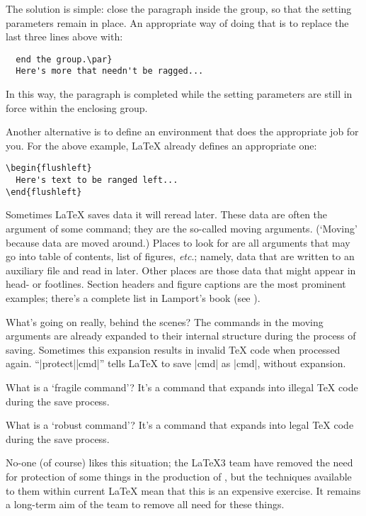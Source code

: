 \begin{changemargin}{-1cm}{-1cm}
The solution is simple: close the paragraph inside the group, so that
the setting parameters remain in place.  An appropriate way of doing
that is to replace the last three lines above with:
\begin{verbatim}
  end the group.\par}
  Here's more that needn't be ragged...
\end{verbatim}
In this way, the paragraph is completed while the setting parameters
are still in force within the enclosing group.

Another alternative is to define an environment that does the
appropriate job for you.  For the above example, \LaTeX{} already
defines an appropriate one:
\begin{verbatim}
\begin{flushleft}
  Here's text to be ranged left...
\end{flushleft}
\end{verbatim}


Sometimes \LaTeX{} saves data it will reread later. These data are
often the argument of some command; they are the so-called moving
arguments.  (`Moving' because data are moved around.)  Places to look for
are all arguments that may go into table of contents, list of figures,
\emph{etc}.; namely, data that are written to an auxiliary file and
read in later.  Other places are those data that might appear in head-
or footlines.  Section headers and figure captions are the most
prominent examples; there's a complete list in Lamport's book
(see ).


What's going on really, behind the scenes? The commands in the moving
arguments are already expanded to their internal structure during the
process of saving. Sometimes this expansion results in invalid \TeX{}
code when processed again. ``\cs|protect|\cs|cmd|'' tells \LaTeX{} to save
\cs|cmd| as \cs|cmd|, without expansion.

What is a `fragile command'?  It's a command that expands into illegal
\TeX{} code during the save process.

What is a `robust command'?  It's a command that expands into legal
\TeX{} code during the save process.

No-one (of course) likes this situation; the \LaTeX{}3 team have
removed the need for protection of some things in the production of
\LaTeXe{}, but the techniques available to them within current
\LaTeX{} mean that this is an expensive exercise.  It remains a
long-term aim of the team to remove all need for these things.


\end{changemargin}
